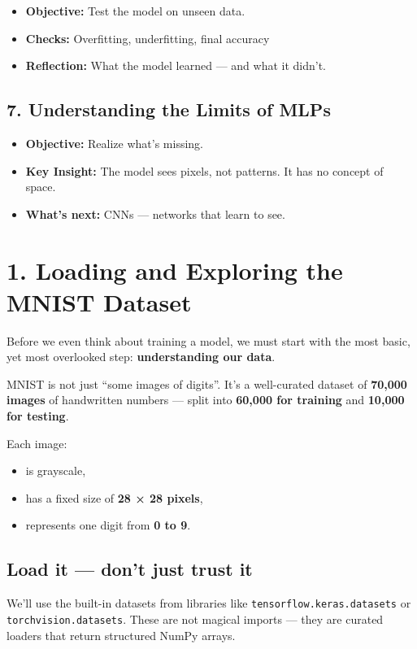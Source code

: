 \documentclass[11pt]{article}
\begin{document}
\begin{itemize}
    \item \textbf{Objective:} Test the model on unseen data.
    \item \textbf{Checks:} Overfitting, underfitting, final accuracy
    \item \textbf{Reflection:} What the model learned — and what it didn’t.
\end{itemize}

\subsection*{7. Understanding the Limits of MLPs}

\begin{itemize}
    \item \textbf{Objective:} Realize what’s missing.
    \item \textbf{Key Insight:} The model sees pixels, not patterns. It has no concept of space.
    \item \textbf{What’s next:} CNNs — networks that learn to see.
\end{itemize}


\newpage
\section*{1. Loading and Exploring the MNIST Dataset}

Before we even think about training a model, we must start with the most basic, yet most overlooked step: \textbf{understanding our data}.

MNIST is not just “some images of digits”. It’s a well-curated dataset of \textbf{70,000 images} of handwritten numbers — split into \textbf{60,000 for training} and \textbf{10,000 for testing}.

Each image:
\begin{itemize}
    \item is grayscale,
    \item has a fixed size of \textbf{28 × 28 pixels},
    \item represents one digit from \textbf{0 to 9}.
\end{itemize}

\subsection*{Load it — don’t just trust it}
We’ll use the built-in datasets from libraries like \texttt{tensorflow.keras.datasets} or \texttt{torchvision.datasets}. These are not magical imports — they are curated loaders that return structured NumPy arrays.
\end{document}
